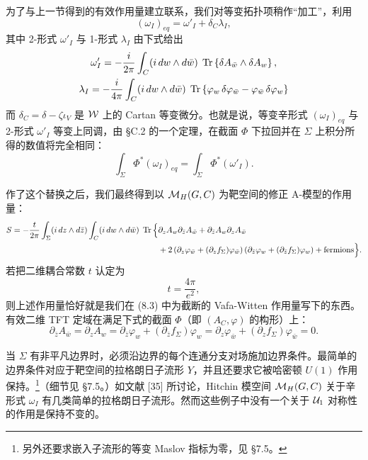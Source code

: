 为了与上一节得到的有效作用量建立联系，我们对等变拓扑项稍作“加工”，利用
\[
(\omega_I)_{eq}=\omega'_I+\delta_C\lambda_I,
\]
其中 2-形式 $\omega'_I$ 与 1-形式 $\lambda_I$ 由下式给出
\begin{gather}
\omega'_I=-\frac{i}{2\pi}\int_C(i\,d w\wedge d\bar w)\;\operatorname{Tr}\left\{\delta A_{\bar w}\wedge\delta A_w\right\}, \notag\\
\lambda_I=-\frac{i}{4\pi}\int_C(i\,d w\wedge d\bar w)\;\operatorname{Tr}\left\{\varphi_w\,\delta\varphi_{\bar w}-\varphi_{\bar w}\,\delta\varphi_w\right\} \notag
\end{gather}
而 $\delta_C=\delta-\zeta\iota_V$ 是 $\mathcal{W}$ 上的 Cartan 等变微分。也就是说，等变辛形式 $(\omega_I)_{eq}$ 与 2-形式 $\omega'_I$ 等变上同调，由 §C.2 的一个定理，在截面 $\Phi$ 下拉回并在 $\Sigma$ 上积分所得的数值将完全相同：
\[
\int_\Sigma\Phi^*(\omega_I)_{eq}=\int_\Sigma\Phi^*(\omega'_I).
\]

作了这个替换之后，我们最终得到以 $\mathcal{M}_H(G,C)$ 为靶空间的修正 A-模型的作用量：
\begin{equation*}
\begin{aligned}
S=-\frac{t}{2\pi}\int_\Sigma(i\,d z\wedge d\bar z)\int_C(i\,d w\wedge d\bar w)\;\operatorname{Tr}\Big\{&\partial_zA_w\partial_{\bar z}A_{\bar w}+\partial_{\bar z}A_w\partial_zA_{\bar w}\\
&+2\left(\partial_z\varphi_{\bar w}+(\partial_zf_\Sigma)\varphi_{\bar w}\right)\left(\partial_{\bar z}\varphi_w+(\partial_{\bar z}f_\Sigma)\varphi_w\right)+\text{fermions}\Big\}.
\end{aligned}
\end{equation*}
若把二维耦合常数 $t$ 认定为
\[
t=\frac{4\pi}{e^2},
\]
则上述作用量恰好就是我们在 (8.3) 中为截断的 Vafa-Witten 作用量写下的东西。有效二维 TFT 定域在满足下式的截面 $\Phi$（即 $(A_C,\varphi)$ 的构形）上：
\[
\partial_{\bar z}A_{\bar w}=\partial_zA_w=\partial_{\bar z}\varphi_w+(\partial_{\bar z}f_\Sigma)\varphi_w=\partial_z\varphi_{\bar w}+(\partial_zf_\Sigma)\varphi_{\bar w}=0 .
\]


当 $\Sigma$ 有非平凡边界时，必须沿边界的每个连通分支对场施加边界条件。最简单的边界条件对应于靶空间的拉格朗日子流形 $Y$，并且还要求它被哈密顿 $U(1)$ 作用保持。\footnote{另外还要求嵌入子流形的等变 Maslov 指标为零，见 §7.5。}（细节见 §7.5。）如文献 [35] 所讨论，Hitchin 模空间 $\mathcal{M}_H(G,C)$ 关于辛形式 $\omega_I$ 有几类简单的拉格朗日子流形。然而这些例子中没有一个关于 $\mathcal{U}_1$ 对称性的作用是保持不变的。
